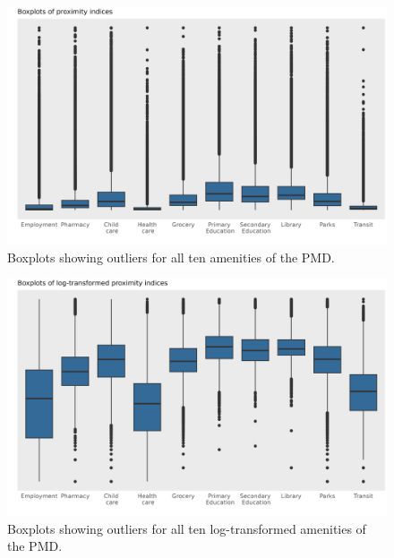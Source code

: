 \documentclass[11pt, a4paper]{article}
\begin{document}
\pagebreak

\begin{figure}[H]
\centering
\includegraphics[width=\textwidth]{./outliers/boxplot.png}
\caption[Boxplots of outliers]{Boxplots showing outliers for all ten amenities of the PMD.}\label{boxoutliers}
\end{figure}







\begin{figure}[H]
\centering
\includegraphics[width=\textwidth]{./outliers/logged_boxplot.png}
\caption[Boxplots of log outliers]{ Boxplots showing outliers for all ten log-transformed amenities of the PMD.}\label{logboxoutliers}
\end{figure}
\end{document}
